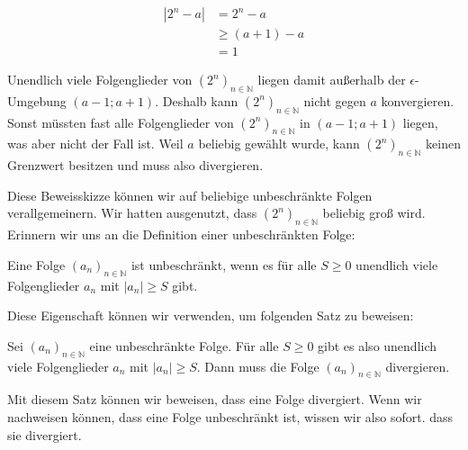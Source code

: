 \documentclass[fontsize=9pt,
               parskip=half-,
               DIV=14,
               listof=chapterentry,
               tocflat]{scrbook}
\begin{document}
\begin{align*}
|2^{n}-a|&=2^{n}-a\\&\geq (a+1)-a\\&=1
\end{align*}

Unendlich viele Folgenglieder von $\left(2^{n}\right)_{n\in \mathbb {N} }$ liegen damit außerhalb der $\epsilon $-Umgebung $(a-1;a+1)$. Deshalb kann $\left(2^{n}\right)_{n\in \mathbb {N} }$ nicht gegen $a$ konvergieren. Sonst müssten fast alle Folgenglieder von $\left(2^{n}\right)_{n\in \mathbb {N} }$ in $(a-1;a+1)$ liegen, was aber nicht der Fall ist. Weil $a$ beliebig gewählt wurde, kann $\left(2^{n}\right)_{n\in \mathbb {N} }$ keinen Grenzwert besitzen und muss also divergieren.

Diese Beweisskizze können wir auf beliebige unbeschränkte Folgen verallgemeinern. Wir hatten ausgenutzt, dass $\left(2^{n}\right)_{n\in \mathbb {N} }$ beliebig groß wird. Erinnern wir uns an die Definition einer unbeschränkten Folge:

\begin{importantparagraph*}
Eine Folge $(a_{n})_{n\in \mathbb {N} }$ ist unbeschränkt, wenn es für alle $S\geq 0$ unendlich viele Folgenglieder $a_{n}$ mit $|a_{n}|\geq S$ gibt.

\end{importantparagraph*}

Diese Eigenschaft können wir verwenden, um folgenden Satz zu beweisen:

\begin{theorem*}
Sei $(a_{n})_{n\in \mathbb {N} }$ eine unbeschränkte Folge. Für alle $S\geq 0$ gibt es also unendlich viele Folgenglieder $a_{n}$ mit $|a_{n}|\geq S$. Dann muss die Folge $(a_{n})_{n\in \mathbb {N} }$ divergieren.

\end{theorem*}

\begin{explanation*}
Mit diesem Satz können wir beweisen, dass eine Folge divergiert. Wenn wir nachweisen können, dass eine Folge unbeschränkt ist, wissen wir also sofort. dass sie divergiert.

\end{explanation*}
\end{document}
